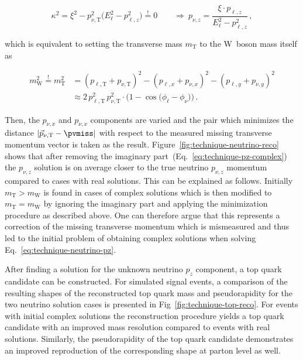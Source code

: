 \begin{equation}
\kappa^{2}=\xi^2-p_{\nu,\mathrm{T}}^2\big(E_{\ell}^2-p_{\ell,z}^2\big)\overset{!}{=}0\qquad
\Rightarrow~ p_{\nu,z}=\frac{\xi\cdot p_{\ell,z}}{E_{\ell}^{2}-p_{\ell,z}^{2}}\,,\label{eq:technique-pz-complex}
\end{equation}

which is equivalent to setting the transverse mass $m_\mathrm{T}$ to the W~boson mass itself as

\begin{align}
m_\mathrm{W}^2\overset{!}{=}m_\mathrm{T}^2&=(p_{\ell,\mathrm{T}}+p_{\nu,\mathrm{T}})^2-(p_{\ell,x}+p_{\nu,x})^{2}-(p_{\ell,y}+p_{\nu,y})^{2}\nonumber\\
&\approx2\,p_{\ell,\mathrm{T}}^2\,p_{\nu,\mathrm{T}}^2\cdot\Big(1-\cos\big(\phi_\ell-\phi_\nu\big)\Big)\,.
\end{align}

Then, the $p_{\nu,x}$ and $p_{\nu,x}$ components are varied and the pair which minimizes the distance $|\vec{p}_{\nu,\mathrm{T}}-\pvmiss|$ with respect to the measured missing transverse momentum vector is taken as the result. Figure~\ref{fig:technique-neutrino-reco} shows that after removing the imaginary part~(Eq.~\ref{eq:technique-pz-complex}) the $p_{\nu,z}$ solution is on average closer to the true neutrino $p_{\nu,z}$ momentum compared to cases with real solutions. This can be explained as follows. Initially $m_\mathrm{T}>m_\mathrm{W}$ is found in cases of complex solutions which is then modified to $m_\mathrm{T}=m_\mathrm{W}$ by ignoring the imaginary part and applying the minimization procedure as described above. One can therefore argue that this represents a correction of the missing transverse momentum which is mismeasured and thus led to the initial problem of obtaining complex solutions when solving Eq.~\ref{eq:technique-neutrino-pz}.

After finding a solution for the unknown neutrino $p_{z}$ component, a top quark candidate can be constructed. For simulated signal events, a comparison of the resulting shapes of the reconstructed top quark mass and pseudorapidity for the two neutrino solution cases is presented in Fig~\ref{fig:technique-top-reco}. For events with initial complex solutions the reconstruction procedure yields a top quark candidate with an improved mass resolution compared to events with real solutions. Similarly, the pseudorapidity of the top quark candidate demonstrates an improved reproduction of the corresponding shape at parton level as well.


